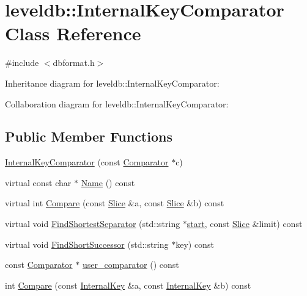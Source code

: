 \hypertarget{classleveldb_1_1_internal_key_comparator}{\section{leveldb\-:\-:Internal\-Key\-Comparator Class Reference}
\label{classleveldb_1_1_internal_key_comparator}
}


{\ttfamily \#include $<$dbformat.\-h$>$}



Inheritance diagram for leveldb\-:\-:Internal\-Key\-Comparator\-:


Collaboration diagram for leveldb\-:\-:Internal\-Key\-Comparator\-:
\subsection*{Public Member Functions}
\begin{DoxyCompactItemize}
\item 
\hyperlink{classleveldb_1_1_internal_key_comparator_a0069a8b4828f592da66937e2c3471080}{Internal\-Key\-Comparator} (const \hyperlink{structleveldb_1_1_comparator}{Comparator} $\ast$c)
\item 
virtual const char $\ast$ \hyperlink{classleveldb_1_1_internal_key_comparator_a762ec9028955d3a5fc61fb5c718ff4f1}{Name} () const 
\item 
virtual int \hyperlink{classleveldb_1_1_internal_key_comparator_a6469a0d67a9025173d31ec6e1cd5f80e}{Compare} (const \hyperlink{classleveldb_1_1_slice}{Slice} \&a, const \hyperlink{classleveldb_1_1_slice}{Slice} \&b) const 
\item 
virtual void \hyperlink{classleveldb_1_1_internal_key_comparator_afe98c9042e34927e60e078fc103991bf}{Find\-Shortest\-Separator} (std\-::string $\ast$\hyperlink{db__bench_8cc_ab376b87f96a574a793c03c53e75afec8}{start}, const \hyperlink{classleveldb_1_1_slice}{Slice} \&limit) const 
\item 
virtual void \hyperlink{classleveldb_1_1_internal_key_comparator_a5dc88f433ef3a0d9508ec17cb40d3e27}{Find\-Short\-Successor} (std\-::string $\ast$key) const 
\item 
const \hyperlink{structleveldb_1_1_comparator}{Comparator} $\ast$ \hyperlink{classleveldb_1_1_internal_key_comparator_a86ca575a4560bb76e2bcebc0618abd31}{user\-\_\-comparator} () const 
\item 
int \hyperlink{classleveldb_1_1_internal_key_comparator_a4ff5764f03e6d8244c8798e0588552a7}{Compare} (const \hyperlink{classleveldb_1_1_internal_key}{Internal\-Key} \&a, const \hyperlink{classleveldb_1_1_internal_key}{Internal\-Key} \&b) const 
\end{DoxyCompactItemize}
